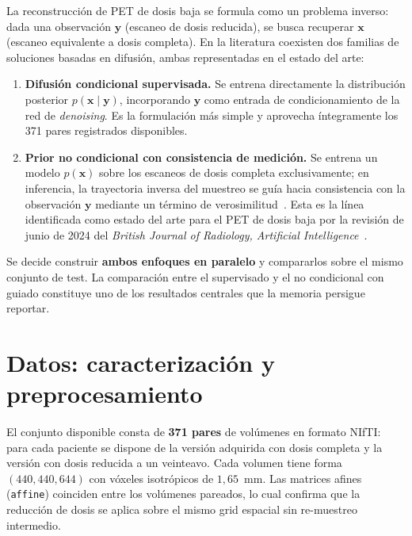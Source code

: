La reconstrucción de PET de dosis baja se formula como un
problema inverso: dada una observación $\mathbf{y}$ (escaneo de
dosis reducida), se busca recuperar $\mathbf{x}$ (escaneo
equivalente a dosis completa). En la literatura coexisten dos
familias de soluciones basadas en difusión, ambas representadas
en el estado del arte:

\begin{enumerate}[leftmargin=*]
    \item \textbf{Difusión condicional supervisada.} Se entrena
    directamente la distribución posterior $p(\mathbf{x} \mid
    \mathbf{y})$, incorporando $\mathbf{y}$ como entrada de
    condicionamiento de la red de \textit{denoising}. Es la
    formulación más simple y aprovecha íntegramente los 371
    pares registrados disponibles.

    \item \textbf{Prior no condicional con consistencia de
    medición.} Se entrena un modelo $p(\mathbf{x})$ sobre los
    escaneos de dosis completa exclusivamente; en inferencia,
    la trayectoria inversa del muestreo se guía hacia
    consistencia con la observación $\mathbf{y}$ mediante un
    término de verosimilitud~\cite{chung2023dps}. Esta es la
    línea identificada como estado del arte para el PET de
    dosis baja por la revisión de junio de 2024 del
    \textit{British Journal of Radiology, Artificial
    Intelligence}~\cite{bjrai2024}.
\end{enumerate}

Se decide construir \textbf{ambos enfoques en paralelo} y
compararlos sobre el mismo conjunto de test. La comparación
entre el supervisado y el no condicional con guiado constituye
uno de los resultados centrales que la memoria persigue reportar.

\section{Datos: caracterización y preprocesamiento}
\label{sec:pet-datos}

El conjunto disponible consta de \textbf{371 pares} de volúmenes
en formato NIfTI: para cada paciente se dispone de la versión
adquirida con dosis completa y la versión con dosis reducida a un
veinteavo. Cada volumen tiene forma $(440, 440, 644)$ con vóxeles
isotrópicos de $1{,}65$~mm. Las matrices afines (\texttt{affine})
coinciden entre los volúmenes pareados, lo cual confirma que la
reducción de dosis se aplica sobre el mismo grid espacial sin
re-muestreo intermedio.

